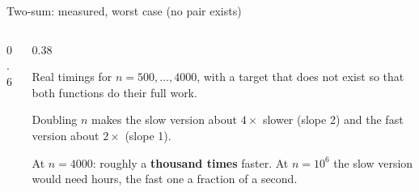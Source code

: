 \documentclass[aspectratio=169,10pt]{beamer}
\begin{document}
\begin{frame}{Two-sum: measured, worst case (no pair exists)}
\begin{columns}[T]
\begin{column}{0.6\textwidth}
\begin{sfig}[0.64]
\end{sfig}
\end{column}
\begin{column}{0.38\textwidth}
{\small
Real timings for $n=500,\dots,4000$, with a target that does not exist so that both functions do their full work.

\vspace{2mm}
Doubling $n$ makes the slow version about $4\times$ slower (slope 2) and the fast version about $2\times$ (slope 1).

\vspace{2mm}
At $n=4000$: roughly a \textbf{thousand times} faster. At $n=10^6$ the slow version would need hours, the fast one a fraction of a second.}
\end{column}
\end{columns}
\end{frame}
\end{document}
